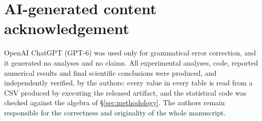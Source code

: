 \documentclass[conference]{IEEEtran}
\begin{document}
\section*{AI-generated content acknowledgement}

OpenAI ChatGPT (GPT-6) was used only for grammatical error correction, and it generated no
analyses and no claims.  All experimental analyses, code, reported numerical results and final
scientific conclusions were produced, and independently verified, by the authors: every value in
every table is read from a CSV produced by executing the released artifact, and the statistical
code was checked against the algebra of \S\ref{sec:methodology}.  The authors remain responsible
for the correctness and originality of the whole manuscript.



\end{document}
